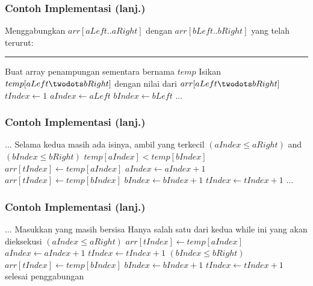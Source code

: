 \begin{frame}
\frametitle{Contoh Implementasi (lanj.)}
Menggabungkan $arr[aLeft..aRight]$ dengan $arr[bLeft..bRight]$ yang telah terurut:
\noindent\rule{10cm}{0.4pt}
\begin{codebox}
\li \Comment Buat array penampungan sementara bernama $temp$
\li \Comment Isikan $temp[aLeft \twodots bRight]$ dengan nilai dari $arr[aLeft \twodots bRight]$
\li $tIndex \gets 1$
\li $aIndex \gets aLeft$
\li $bIndex \gets bLeft$
\li $...$
\end{codebox}
\end{frame}

\begin{frame}
\frametitle{Contoh Implementasi (lanj.)}
\begin{codebox}
\setcounter{codelinenumber}{4}
\li $...$
\li \Comment Selama kedua \fsubarray masih ada isinya, ambil yang terkecil
\li \While $(aIndex \leq aRight)$ and $(bIndex \leq bRight)$ \Do
\li   \If $temp[aIndex] < temp[bIndex]$ \Then
\li     $arr[tIndex] \gets temp[aIndex]$
\li     $aIndex \gets aIndex + 1$
\li   \Else
\li     $arr[tIndex] \gets temp[bIndex]$
\li     $bIndex \gets bIndex + 1$
      \End
\li   $tIndex \gets tIndex + 1$
    \End
\li $...$
\end{codebox}
\end{frame}

\begin{frame}
\frametitle{Contoh Implementasi (lanj.)}
\begin{codebox}
\setcounter{codelinenumber}{13}
\li $...$
\li \Comment Masukkan \fsubarray yang masih bersisa
\li \Comment Hanya salah satu dari kedua while ini yang akan dieksekusi
\li \While $(aIndex \leq aRight)$ \Do
\li   $arr[tIndex] \gets temp[aIndex]$
\li   $aIndex \gets aIndex + 1$
\li   $tIndex \gets tIndex + 1$
    \End
\li \While $(bIndex \leq bRight)$ \Do
\li   $arr[tIndex] \gets temp[bIndex]$
\li   $bIndex \gets bIndex + 1$
\li   $tIndex \gets tIndex + 1$
    \End
\li \Comment selesai penggabungan
\end{codebox}
\end{frame}


